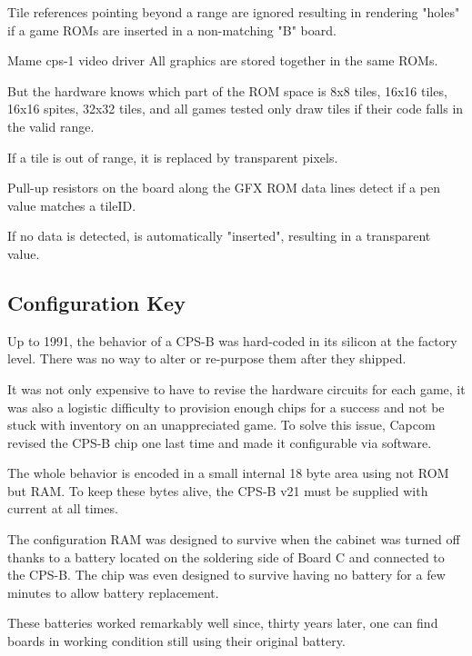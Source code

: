 Tile references pointing beyond a range are ignored resulting in rendering "holes" if a game ROMs are inserted in a non-matching "B" board.

\begin{q}{Mame cps-1 video driver}
All graphics are
stored together in the same ROMs.

But the hardware knows which part of the ROM space
is 8x8 tiles, 16x16 tiles, 16x16 spites, 32x32 tiles, and all games tested only
draw tiles if their code falls in the valid range. 

If a tile is out of range, it is replaced by transparent pixels.
\end{q}

\begin{trivia}
Pull-up resistors on the board along the GFX ROM data lines detect if a pen value matches a tileID. 

If no data is detected,  is automatically "inserted", resulting in a transparent value.
\end{trivia}



\subsection{Configuration Key}
Up to 1991, the behavior of a CPS-B was hard-coded in its silicon at the factory level. There was no way to alter or re-purpose them after they shipped. 

It was not only expensive to have to revise the hardware circuits for each game, it was also a logistic difficulty to provision enough chips for a success and not be stuck with inventory on an unappreciated game. To solve this issue, Capcom revised the CPS-B chip one last time and made it configurable via software.

The whole behavior is encoded in a small internal 18 byte area using not ROM but RAM. To keep these bytes alive, the CPS-B v21 must be supplied with current at all times\cite{petitSecurity}.

The configuration RAM was designed to survive when the cabinet was turned off thanks to a battery located  on the soldering side of Board C and connected to the CPS-B. The chip was even designed to survive having no battery for a few minutes to allow battery replacement.

\begin{trivia}
These batteries worked remarkably well since, thirty years later, one can find boards in working condition still using their original battery.
\end{trivia}

